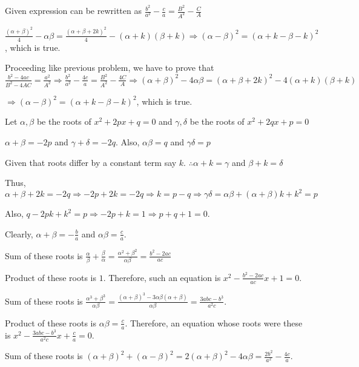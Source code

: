   Given expression can be rewritten as $\frac{b^2}{a^2} - \frac{c}{a} = \frac{B^2}{A^2} - \frac{C}{A}$

  $\frac{(\alpha + \beta)^2}{4} - \alpha\beta = \frac{(\alpha + \beta + 2k)^2}{4} - (\alpha + k)(\beta +
  k)\Rightarrow (\alpha - \beta)^2 = (\alpha + k - \beta - k)^2$, which is true.
\item Proceeding like previous problem, we have to prove that $\frac{b^2 - 4ac}{B^2 - 4AC} = \frac{a^2}{A^2}
  \Rightarrow \frac{b^2}{a^2} - \frac{4c}{a} = \frac{B^2}{A^2} - \frac{4C}{A} \Rightarrow (\alpha + \beta)^2
  - 4\alpha\beta = (\alpha + \beta + 2k)^2 - 4(\alpha + k)(\beta + k)$

  $\Rightarrow (\alpha - \beta)^2 = (\alpha + k - \beta - k)^2$, which is true.
\item Let $\alpha, \beta$ be the roots of $x^2 + 2px + q = 0$ and $\gamma, \delta$ be the roots of
  $x^2 + 2qx + p = 0$

  $\alpha + \beta = -2p$ and $\gamma + \delta = -2q.$ Also, $\alpha\beta = q$ and
  $\gamma\delta = p$

  Given that roots differ by a constant term say $k$. $\therefore \alpha + k = \gamma$ and $\beta +
  k = \delta$

  Thus, $\alpha + \beta + 2k = -2q \Rightarrow -2p + 2k = -2q \Rightarrow k = p - q\Rightarrow
  \gamma\delta = \alpha\beta + (\alpha + \beta)k + k^2 = p$

  Also, $q - 2pk + k^2 = p \Rightarrow -2p + k = 1 \Rightarrow p + q + 1 = 0$.
\item Clearly, $\alpha + \beta = -\frac{b}{a}$ and $\alpha\beta = \frac{c}{a}$.
  \startitemize[i]
  \item Sum of these roots is $\frac{\alpha}{\beta} + \frac{\beta}{\alpha} = \frac{\alpha^2 +
    \beta^2}{\alpha\beta} = \frac{b^2 - 2ac}{ac}$

    Product of these roots is $1$. Therefore, such an equation is $x^2 -\frac{b^2 - 2ac}{ac}x + 1 = 0$.
  \item Sum of these roots is $\frac{\alpha^3 + \beta^3}{\alpha\beta} = \frac{(\alpha + \beta)^3 -
    3\alpha\beta(\alpha + \beta)}{\alpha\beta} = \frac{3abc - b^3}{a^2c}$.

    Product of these roots is $\alpha\beta = \frac{c}{a}$. Therefore, an equation whose roots were these is
    $x^2 - \frac{3abc - b^3}{a^2c}x + \frac{c}{a} = 0$.
  \item Sum of these roots is $(\alpha + \beta)^2 + (\alpha - \beta)^2 = 2(\alpha + \beta)^2 -
    4\alpha\beta = \frac{2b^2}{a^2} - \frac{4c}{a}$.

